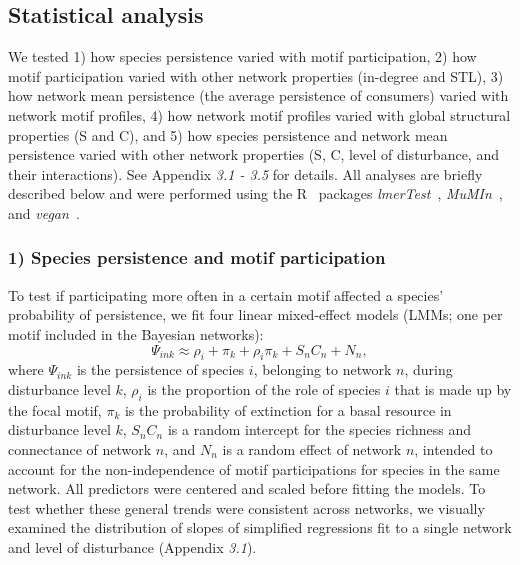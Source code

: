 \documentclass[12pt]{article}
\begin{document}
\begin{spacing}{2.0}
	\subsection*{Statistical analysis} 

	We tested 1) how species persistence varied with motif participation, 2) how motif participation varied with other network properties (in-degree and STL), 3) how network mean persistence (the average persistence of consumers) varied with network motif profiles, 4) how network motif profiles varied with global structural properties (S and C), and 5) how species persistence and network mean persistence varied with other network properties (S, C, level of disturbance, and their interactions).
	See Appendix \emph{3.1 - 3.5} for details. 
	All analyses are briefly described below and were performed using the R~\citep{R} packages \emph{lmerTest}~\citep{lmerTest}, \emph{MuMIn}~\citep{MuMIn}, and \emph{vegan}~\citep{vegan}.

    
    \subsubsection*{1) Species persistence and motif participation}

        To test if participating more often in a certain motif affected a species' probability of persistence, we fit four linear mixed-effect models (LMMs; one per motif included in the Bayesian networks):
            \begin{equation}
                \Psi_{ink} \approx \rho_{i} + \pi_{k} + \rho_{i}\pi_{k} +
                S_{n}C_{n} + N_n,
                \label{propreq}
            \end{equation}
        \noindent where $\Psi_{ink}$ is the persistence of species $i$, belonging to network $n$, during disturbance level $k$, $\rho_{i}$ is the proportion of the role of species $i$ that is made up by the focal motif, $\pi_k$ is the probability of extinction for a basal resource in disturbance level $k$,  $S_{n}C_{n}$ is a random intercept for the species richness and connectance of network $n$, and $N_n$ is a random effect of network $n$, intended to account for the non-independence of motif participations for species in the same network.
        All predictors were centered and scaled before fitting the models.         
        To test whether these general trends were consistent across networks, we visually examined the distribution of slopes of simplified regressions fit to a single network and level of disturbance (Appendix \emph{3.1}).
    

\end{spacing}
\end{document}
